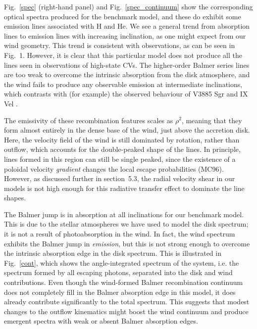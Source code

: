 \documentclass[preprint, a4paper, 11pt]{aastex}
\begin{document}
Fig.~\ref{spec} (right-hand panel) and Fig.~\ref{spec_continuum}
show the corresponding optical spectra produced for
the benchmark model, and these do exhibit some emission lines
associated with H and He. We see a general trend from absorption lines to emission lines 
with increasing inclination, as one might expect from our wind
geometry. This trend is consistent with observations, as can be seen
in Fig.~1. However, it is clear that this particular model
does not produce all the lines seen in observations of high-state CVs.
The higher-order Balmer series lines are too weak
to overcome the intrinsic absorption from the disk atmosphere, and the wind 
fails to produce any observable emission at intermediate inclinations, 
which contrasts with (for example) the observed behaviour of V3885 Sgr \citep{hartley2005}
and IX Vel \citep[][see also Fig.~1]{beuermann1990}.

The emissivity of these recombination 
features scales as $\rho^2$, meaning that they form almost entirely in the 
dense base of the wind, just above the accretion disk. Here, the
velocity field of the wind is still dominated by rotation, rather than
outflow, which accounts for the double-peaked shape of the lines. In
principle, lines formed in this region can still be single peaked,
since the existence of a poloidal velocity {\em gradient} changes the
local escape probabilities (MC96). However, as
discussed further in section~5.3, the 
radial velocity shear in our
models is not high enough for this radiative transfer effect
to dominate the line shapes.

The Balmer jump is in absorption at all inclinations for our benchmark
model. This is due to the stellar atmospheres we have used to
model the disk spectrum; it is not a result of photoabsorption in the
wind. In fact, the wind spectrum exhibits the Balmer jump in {\em
emission}, but this is not strong enough to overcome the intrinsic
absorption edge in the disk spectrum. This is illustrated in
Fig.~\ref{cont}, which shows the angle-integrated spectrum of the system,
i.e. the spectrum formed by all escaping photons, separated into the
disk and wind contributions. Even though the wind-formed Balmer
recombination continuum does not completely fill in the Balmer
absorption edge in this model, it does already contribute
significantly to the total spectrum. This suggests that modest changes 
to the outflow kinematics might boost the wind continuum and produce
emergent spectra with weak or absent Balmer absorption edges. 
\end{document}
